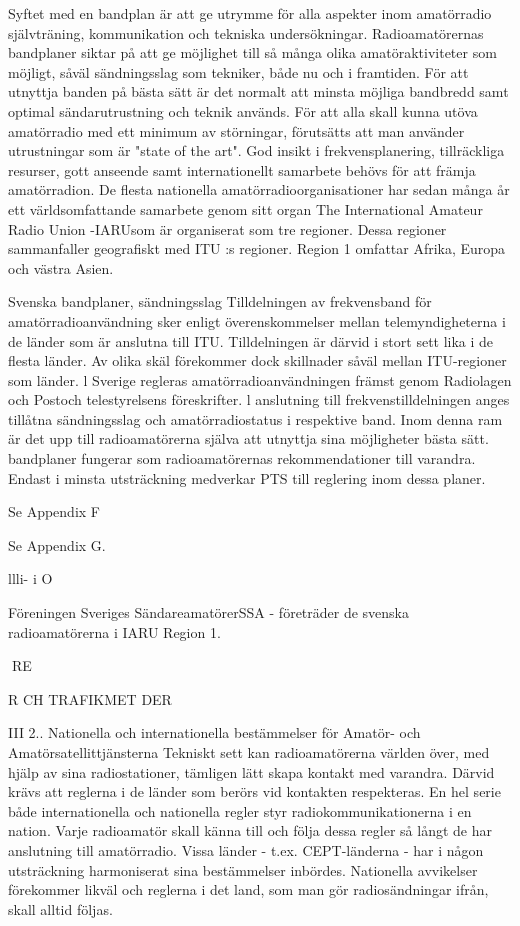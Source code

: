 \documentclass[a4paper,twoside,twocolumn,openright]{book}
\begin{document}
{{{{{Syftet med en bandplan är att ge utrymme för alla aspekter inom amatörradio självträning, kommunikation och tekniska
undersökningar.
Radioamatörernas bandplaner siktar på
att ge möjlighet till så många olika amatöraktiviteter som möjligt, såväl sändningsslag
som tekniker, både nu och i framtiden. För
att utnyttja banden på bästa sätt är det normalt att minsta möjliga bandbredd samt optimal sändarutrustning och teknik används.
För att alla skall kunna utöva amatörradio
med ett minimum av störningar, förutsätts att
man använder utrustningar som är "state of
the art".
God insikt i frekvensplanering, tillräckliga
resurser, gott anseende samt internationellt
samarbete behövs för att främja amatörradion. De flesta nationella amatörradioorganisationer har sedan många år ett världsomfattande samarbete genom sitt organ The
International Amateur Radio Union -IARUsom är organiserat som tre regioner. Dessa
regioner sammanfaller geografiskt med ITU :s
regioner. Region 1 omfattar Afrika, Europa
och västra Asien.

Svenska bandplaner, sändningsslag
Tilldelningen av frekvensband för amatörradioanvändning sker enligt överenskommelser mellan telemyndigheterna i de länder som är anslutna till ITU. Tilldelningen är
därvid i stort sett lika i de flesta länder. Av
olika skäl förekommer dock skillnader såväl
mellan ITU-regioner som länder.
l Sverige regleras amatörradioanvändningen främst genom Radiolagen och Postoch telestyrelsens föreskrifter. l anslutning
till frekvenstilldelningen anges tillåtna sändningsslag och amatörradiostatus i respektive band. Inom denna ram är det upp till
radioamatörerna själva att utnyttja sina möjligheter
bästa sätt.
bandplaner fungerar som radioamatörernas rekommendationer till varandra. Endast i minsta utsträckning medverkar
PTS till reglering inom dessa planer.

Se Appendix F

Se Appendix G.

llli- i O

Föreningen Sveriges SändareamatörerSSA - företräder de svenska radioamatörerna i IARU Region 1.

RE

R CH TRAFIKMET DER

III 2.. Nationella och internationella bestämmelser för
Amatör- och Amatörsatellittjänsterna
Tekniskt sett kan radioamatörerna världen
över, med hjälp av sina radiostationer, tämligen lätt skapa kontakt med varandra. Därvid krävs att reglerna i de länder som berörs
vid kontakten respekteras.
En hel serie både internationella och nationella regler styr radiokommunikationerna
i en nation. Varje radioamatör skall känna till
och följa dessa regler så långt de har anslutning till amatörradio. Vissa länder - t.ex.
CEPT-länderna - har i någon utsträckning
harmoniserat sina bestämmelser inbördes.
Nationella avvikelser förekommer likväl och
reglerna i det land, som man gör radiosändningar ifrån, skall alltid följas.

}}}}}
\end{document}
